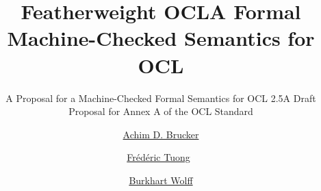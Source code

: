 \documentclass[10pt,DIV12,a4paper,openright,twoside,abstracton]{scrreprt}
\begin{document}
\renewcommand{\subsubsectionautorefname}{Section}
\renewcommand{\subsectionautorefname}{Section}
\renewcommand{\sectionautorefname}{Section}
\renewcommand{\chapterautorefname}{Chapter}
\newcommand{\subtableautorefname}{\tableautorefname}
\newcommand{\subfigureautorefname}{\figureautorefname}

\newenvironment{matharray}[1]{\[\begin{array}{#1}}{\end{array}\]} %
\newcommand{\indexdef}[3]%
{\ifthenelse{\equal{}{#1}}{\index{#3 (#2)|bold}}{\index{#3 (#1\ #2)|bold}}} %



\isatagafp
  \title{Featherweight OCL}
  \subtitle{A Proposal for a Machine-Checked Formal Semantics for OCL 2.5}
\endisatagafp
\isatagannexa
  \title{A Formal Machine-Checked Semantics for OCL}
  \subtitle{A Draft Proposal for Annex A of the OCL Standard}
\endisatagannexa
\author{%
  \href{http://www.brucker.ch/}{Achim D. Brucker}\footnotemark[1]
  \and
  \href{https://www.lri.fr/~tuong/}{Fr\'ed\'eric Tuong}\footnotemark[2]~\footnotemark[3]
  \and
  \href{https://www.lri.fr/~wolff/}{Burkhart Wolff}\footnotemark[2]}
\publishers{%
  \footnotemark[1]~SAP SE, Vincenz-Priessnitz-Str. 1, 76131 Karlsruhe,
  Germany \texorpdfstring{\\}{} \href{mailto:"Achim D. Brucker"
    <achim.brucker@sap.com>}{achim.brucker@sap.com}\\[2em]
  \footnotemark[2]~Univ. Paris-Sud, LRI, CNRS, b\^at. 650, 91405 Orsay,
  France \texorpdfstring{\\}{} \href{mailto:"Burkhart Wolff"
    <burkhart.wolff@lri.fr>}{burkhart.wolff@lri.fr}\\[2em]
  \footnotemark[3]~IRT SystemX, 8 av.~de la Vauve, 91120 Palaiseau,
  France\\
    frederic.tuong@\{u-psud, lri, irt-systemx\}.fr
}


\maketitle
\isatagannexa
\cleardoublepage
\endisatagannexa
\end{document}
